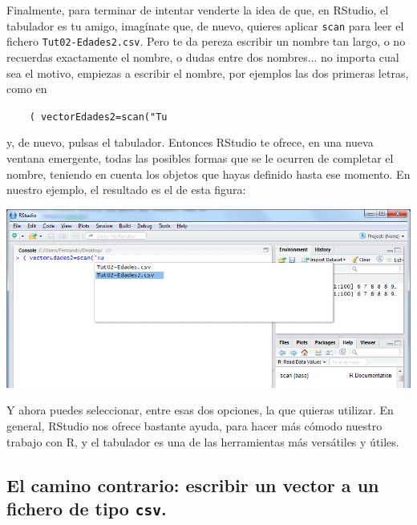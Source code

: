 \documentclass[10pt,a4paper]{article}\usepackage[]{graphicx}\usepackage[]{color}
\newcounter {cont01}
\begin{document}
Finalmente, para terminar de intentar venderte la idea de que, en RStudio, el tabulador es tu amigo, imagínate que, de nuevo, quieres aplicar {\tt scan} para leer el fichero {\tt Tut02-Edades2.csv}. Pero te da pereza escribir un nombre tan largo, o no recuerdas exactamente el nombre, o dudas entre dos nombres... no importa cual sea el motivo, empiezas a escribir el nombre, por ejemplos las dos primeras letras, como en
    \begin{center}
    \begin{minipage}{10cm}
    \verb#    ( vectorEdades2=scan("Tu #
    \end{minipage}
    \end{center}
y, de nuevo, pulsas el tabulador. Entonces RStudio te ofrece, en una nueva ventana emergente, todas las posibles formas que se le ocurren de completar el nombre, teniendo en cuenta los objetos que hayas definido hasta ese momento. En nuestro ejemplo, el resultado es el de esta figura:
    \begin{center}
    \includegraphics[width=14cm]{../fig/Tut02-11a.png}
    \end{center}
Y ahora puedes seleccionar, entre esas dos opciones, la que quieras utilizar. En general, RStudio nos ofrece bastante ayuda, para hacer más cómodo nuestro trabajo con R, y el tabulador es una de las herramientas más versátiles y útiles.

\subsection{El camino contrario:  escribir un vector a un fichero de tipo {\tt csv}.}

\end{document}
